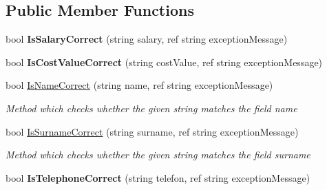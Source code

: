 \subsection*{Public Member Functions}
\begin{DoxyCompactItemize}
\item 
\hypertarget{class_baudi_1_1_client_1_1_view_models_1_1_validation_1_1_data_fields_1_1_data_fields_validator_ab002dc0ade80032125b2477fda37b4e2}{}bool {\bfseries Is\+Salary\+Correct} (string salary, ref string exception\+Message)\label{class_baudi_1_1_client_1_1_view_models_1_1_validation_1_1_data_fields_1_1_data_fields_validator_ab002dc0ade80032125b2477fda37b4e2}

\item 
\hypertarget{class_baudi_1_1_client_1_1_view_models_1_1_validation_1_1_data_fields_1_1_data_fields_validator_ab633ca82bcd70ddf4c8c8a2d42e05888}{}bool {\bfseries Is\+Cost\+Value\+Correct} (string cost\+Value, ref string exception\+Message)\label{class_baudi_1_1_client_1_1_view_models_1_1_validation_1_1_data_fields_1_1_data_fields_validator_ab633ca82bcd70ddf4c8c8a2d42e05888}

\item 
bool \hyperlink{class_baudi_1_1_client_1_1_view_models_1_1_validation_1_1_data_fields_1_1_data_fields_validator_ab1baa967d3fdd51293c14f34e1093614}{Is\+Name\+Correct} (string name, ref string exception\+Message)
\begin{DoxyCompactList}\small\item\em Method which checks whether the given string matches the field name \end{DoxyCompactList}\item 
bool \hyperlink{class_baudi_1_1_client_1_1_view_models_1_1_validation_1_1_data_fields_1_1_data_fields_validator_a8f4547046961cfefdd05f4f5cd76e76d}{Is\+Surname\+Correct} (string surname, ref string exception\+Message)
\begin{DoxyCompactList}\small\item\em Method which checks whether the given string matches the field surname \end{DoxyCompactList}\item 
\hypertarget{class_baudi_1_1_client_1_1_view_models_1_1_validation_1_1_data_fields_1_1_data_fields_validator_a7562ac05d1ade4d027004215296ed30e}{}bool {\bfseries Is\+Telephone\+Correct} (string telefon, ref string exception\+Message)\label{class_baudi_1_1_client_1_1_view_models_1_1_validation_1_1_data_fields_1_1_data_fields_validator_a7562ac05d1ade4d027004215296ed30e}


\end{DoxyCompactItemize}
